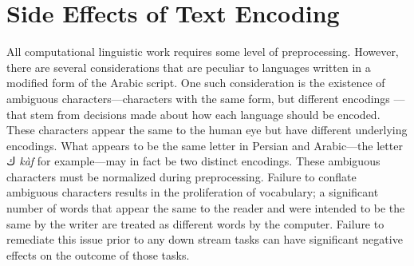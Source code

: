 \documentclass[12pt, oneside]{report}
\begin{document}
\section{Side Effects of Text Encoding}
\par
All computational linguistic work requires some level of preprocessing.
However, there are several considerations that are peculiar to languages written in a modified form of the Arabic script.
One such consideration is the existence of ambiguous characters---characters with the same form, but different encodings \cite{jaf_semi-automatic_2016}---that stem from decisions made about how each language should be encoded.
These characters appear the same to the human eye but have different underlying encodings.
What appears to be the same letter in Persian and Arabic---the letter ك \textit{k\`{a}f} for example---may in fact be two distinct encodings.
These ambiguous characters must be normalized during preprocessing.
Failure to conflate ambiguous characters results in the proliferation of vocabulary; a significant number of words that appear the same to the reader and were intended to be the same by the writer are treated as different words by the computer.
Failure to remediate this issue prior to any down stream tasks can have significant negative effects on the outcome of those tasks.
\end{document}

